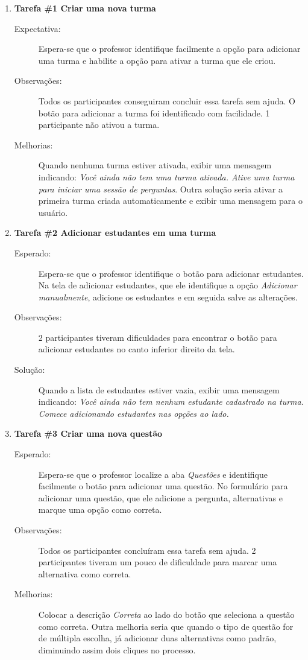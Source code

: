 \begin{enumerate}[label={},leftmargin=*]
  \item \textbf{Tarefa \#1 Criar uma nova turma}
  \begin{description}
    \item [Expectativa:] Espera-se que o professor identifique facilmente a opção para adicionar uma turma e habilite
    a opção para ativar a turma que ele criou.
    \item [Observações:] Todos os participantes conseguiram concluir essa tarefa sem ajuda. O botão
    para adicionar a turma foi identificado com facilidade. 1 participante não ativou a turma.
    \item [Melhorias:] Quando nenhuma turma estiver ativada, exibir uma mensagem indicando:
    \textit{Você ainda não tem uma turma ativada. Ative uma turma para iniciar uma sessão de perguntas}.
    Outra solução seria ativar a primeira turma criada automaticamente e exibir uma mensagem para o usuário.
  \end{description}

  \item \textbf{Tarefa \#2 Adicionar estudantes em uma turma}
  \begin{description}
    \item [Esperado:] Espera-se que o professor identifique o botão para adicionar estudantes. Na tela de adicionar
    estudantes, que ele identifique a opção \textit{Adicionar manualmente}, adicione os estudantes e em seguida
    salve as alterações.
    \item [Observações:] 2 participantes tiveram dificuldades para encontrar o botão para
    adicionar estudantes no canto inferior direito da tela.
    \item [Solução:] Quando a lista de estudantes estiver vazia, exibir uma mensagem indicando:
    \textit{Você ainda não tem nenhum estudante cadastrado na turma. Comece adicionando estudantes nas opções ao lado.}
  \end{description}

  \item \textbf{Tarefa \#3 Criar uma nova questão}
  \begin{description}
    \item [Esperado:] Espera-se que o professor localize a aba \textit{Questões} e identifique facilmente
    o botão para adicionar uma questão. No formulário para adicionar uma questão, que ele
    adicione a pergunta, alternativas e marque uma opção como correta.
    \item[Observações:] Todos os participantes concluíram essa tarefa sem ajuda. 2 participantes
    tiveram um pouco de dificuldade para marcar uma alternativa como correta.
    \item[Melhorias:]
    Colocar a descrição \textit{Correta} ao lado do botão que seleciona a questão como correta.
    Outra melhoria seria que quando o tipo de questão for de múltipla escolha, já adicionar
    duas alternativas como padrão, diminuindo assim dois cliques no processo.
  \end{description}


\end{enumerate}
